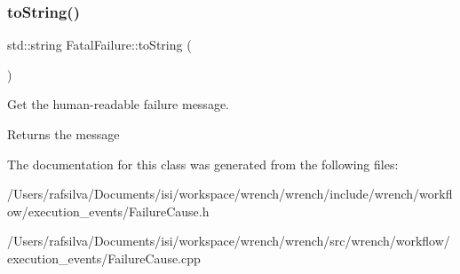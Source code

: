 \subsubsection{\texorpdfstring{to\+String()}{toString()}}
{\footnotesize\ttfamily std\+::string Fatal\+Failure\+::to\+String (\begin{DoxyParamCaption}{ }\end{DoxyParamCaption})}



Get the human-\/readable failure message. 

\begin{DoxyReturn}{Returns}
the message 
\end{DoxyReturn}


The documentation for this class was generated from the following files\+:\begin{DoxyCompactItemize}
\item 
/\+Users/rafsilva/\+Documents/isi/workspace/wrench/wrench/include/wrench/workflow/execution\+\_\+events/Failure\+Cause.\+h\item 
/\+Users/rafsilva/\+Documents/isi/workspace/wrench/wrench/src/wrench/workflow/execution\+\_\+events/Failure\+Cause.\+cpp\end{DoxyCompactItemize}
